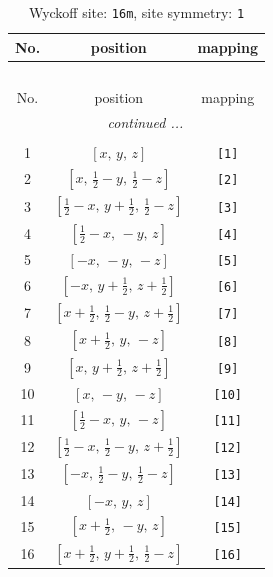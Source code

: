 \documentclass[fleqn,8pt]{jsarticle}
\begin{document}
\begin{longtable}{ccc}
\caption{Wyckoff site: {\tt 16m}, site symmetry: {\tt 1}}
 \\
 \hline \hline
No. & position & mapping \\ \hline \endfirsthead

\multicolumn{2}{l}{\tablename\ \thetable{}} \\
 \hline \hline
No. & position & mapping \\ \hline \endhead

 \hline \hline
\multicolumn{2}{r}{\footnotesize\it continued ...} \\ \endfoot

 \hline \hline
\multicolumn{2}{r}{} \\ \endlastfoot

1 & $\left[ x,\, y,\, z \right]$ & {\tt [1]} \\ \hline
2 & $\left[ x,\, \frac{1}{2} - y,\, \frac{1}{2} - z \right]$ & {\tt [2]} \\ \hline
3 & $\left[ \frac{1}{2} - x,\, y + \frac{1}{2},\, \frac{1}{2} - z \right]$ & {\tt [3]} \\ \hline
4 & $\left[ \frac{1}{2} - x,\, - y,\, z \right]$ & {\tt [4]} \\ \hline
5 & $\left[ - x,\, - y,\, - z \right]$ & {\tt [5]} \\ \hline
6 & $\left[ - x,\, y + \frac{1}{2},\, z + \frac{1}{2} \right]$ & {\tt [6]} \\ \hline
7 & $\left[ x + \frac{1}{2},\, \frac{1}{2} - y,\, z + \frac{1}{2} \right]$ & {\tt [7]} \\ \hline
8 & $\left[ x + \frac{1}{2},\, y,\, - z \right]$ & {\tt [8]} \\ \hline
9 & $\left[ x,\, y + \frac{1}{2},\, z + \frac{1}{2} \right]$ & {\tt [9]} \\ \hline
10 & $\left[ x,\, - y,\, - z \right]$ & {\tt [10]} \\ \hline
11 & $\left[ \frac{1}{2} - x,\, y,\, - z \right]$ & {\tt [11]} \\ \hline
12 & $\left[ \frac{1}{2} - x,\, \frac{1}{2} - y,\, z + \frac{1}{2} \right]$ & {\tt [12]} \\ \hline
13 & $\left[ - x,\, \frac{1}{2} - y,\, \frac{1}{2} - z \right]$ & {\tt [13]} \\ \hline
14 & $\left[ - x,\, y,\, z \right]$ & {\tt [14]} \\ \hline
15 & $\left[ x + \frac{1}{2},\, - y,\, z \right]$ & {\tt [15]} \\ \hline
16 & $\left[ x + \frac{1}{2},\, y + \frac{1}{2},\, \frac{1}{2} - z \right]$ & {\tt [16]} \\
\end{longtable}
\end{document}
